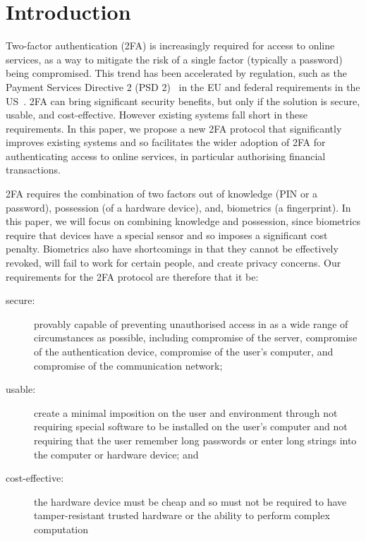 


\section{Introduction}

Two-factor authentication (2FA) is increasingly required for access to online services, as a way to mitigate the risk of a single factor (typically a password) being compromised.
This trend has been accelerated by regulation, such as the Payment Services Directive 2 (PSD 2)~\cite{psd2} in the EU and federal requirements in the US~\cite{Zero-Trust-Cybersecurity}.
2FA can bring significant security benefits, but only if the solution is secure, usable, and cost-effective.
However existing systems fall short in these requirements.
In this paper, we propose a new 2FA protocol that significantly improves existing systems and so facilitates the wider adoption of 2FA for authenticating access to online services, in particular authorising financial transactions.

2FA requires the combination of two factors out of knowledge (\eg PIN or a password), possession (\eg of a hardware device), and, biometrics (\eg a fingerprint).
In this paper, we will focus on combining knowledge and possession, since biometrics require that devices have a special sensor and so imposes a significant cost penalty.
Biometrics also have shortcomings in that they cannot be effectively revoked, will fail to work for certain people, and create privacy concerns. Our requirements for the 2FA protocol are therefore that it be:%
\begin{description}
\item[secure:] provably capable of preventing unauthorised access in as a wide range of circumstances as possible, including compromise of the server, compromise of the authentication device, compromise of the user's computer, and compromise of the communication network;
\item[usable:] create a minimal imposition on the user and environment through not requiring special software to be installed on the user's computer and not requiring that the user remember long passwords or enter long strings into the computer or hardware device; and
\item[cost-effective:] the hardware device must be cheap and so must not be required to have tamper-resistant trusted hardware or the ability to perform complex computation
\end{description}

